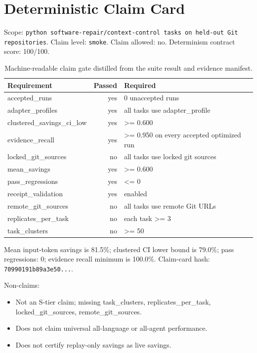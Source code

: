 \section{Deterministic Claim Card}
Scope: \texttt{python software-repair/context-control tasks on held-out Git repositories}. Claim level: \texttt{smoke}. Claim allowed: no. Determinism contract score: 100/100.

\begin{table}[h]
\centering
\begin{tabular}{lrl}
\toprule
Requirement & Passed & Required \\
\midrule
accepted\_runs & yes & 0 unaccepted runs \\
adapter\_profiles & yes & all tasks use adapter\_profile \\
clustered\_savings\_ci\_low & yes & >= 0.600 \\
evidence\_recall & yes & >= 0.950 on every accepted optimized run \\
locked\_git\_sources & no & all tasks use locked git sources \\
mean\_savings & yes & >= 0.600 \\
pass\_regressions & yes & <= 0 \\
receipt\_validation & yes & enabled \\
remote\_git\_sources & no & all tasks use remote Git URLs \\
replicates\_per\_task & no & each task >= 3 \\
task\_clusters & no & >= 50 \\
\bottomrule
\end{tabular}
\caption{Machine-readable claim gate distilled from the suite result and evidence manifest.}
\end{table}

Mean input-token savings is 81.5\%; clustered CI lower bound is 79.0\%; pass regressions: 0; evidence recall minimum is 100.0\%. Claim-card hash: \texttt{70990191b89a3e50...}.

\noindent Non-claims:
\begin{itemize}
\item Not an S-tier claim; missing task\_clusters, replicates\_per\_task, locked\_git\_sources, remote\_git\_sources.
\item Does not claim universal all-language or all-agent performance.
\item Does not certify replay-only savings as live savings.
\end{itemize}

